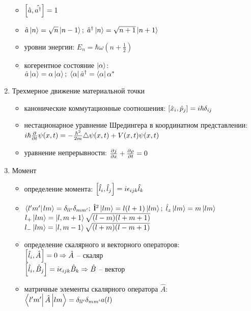 \begin{enumerate}[label=\textbf{\underline{\arabic*.}}]
\begin{itemize}
            \item
            $ \left[ \hat{a}, \hat{a^\dagger} \right] = 1 $
            \item
            $ \hat{a}\left| n \right> = \sqrt{n}\left| n-1 \right>;\; \hat{a}^\dagger\left| n \right> = \sqrt{n+1}\left| n+1 \right> $
            \item уровни энергии:
            $ E_n = \hbar\omega(n+\frac12) $
            \item когерентное состояние $\left| \alpha \right>$: \\
            $ \hat{a}\left| \alpha \right> = \alpha\left| \alpha \right>;\; \left< \alpha \right|\hat{a}^\dagger = \left< \alpha \right|\alpha^* $
        \end{itemize}
\item Трехмерное движение материальной точки  \begin{itemize}
            \item канонические коммутационные соотношения:
            $ \left[ \hat{x}_{i}, \hat{p}_{j} \right] = i\hbar\delta_{ij} $
            \item нестационарное уравнение Шредингера в координатном представлении: \\
            $ i\hbar \frac{\partial }{\partial t}\psi(x,t) = -\frac{\hbar^2}{2m}\triangle\psi(x,t)+V(x,t)\psi(x,t) $
            \item уравнение непрерывности:
            $ \frac{\partial j}{\partial x} + \frac{\partial \rho}{\partial t} = 0 $
        \end{itemize}
\item Момент  \begin{itemize}
            \item определение момента:
            $ \left[ \hat{l}_{i}, \hat{l}_{j} \right] = i\epsilon_{ijk}\hat{l}_k $
            \item
            $ \braket{l'm'}{lm} = \delta_{ll'}\delta_{mm'};\; \hat{\v{l}}^2\ket{lm}=l(l+1)\ket{lm};\; \hat{l}_z\ket{lm}=m\ket{lm} $\\
            $ l_{+}\left| lm \right>=\left| l,m+1 \right>\sqrt{(l-m)(l+m+1)} $\\
            $ l_{-}\left| lm \right>=\left| l,m-1 \right>\sqrt{(l+m)(l-m+1)}$
            \item определение скалярного и векторного операторов: \\
            $ \left[ \hat{l}_{i}, \hat{A}_{} \right] = 0 \Rightarrow \hat{A} $ -- скаляр \\
            $ \left[ \hat{l}_{i}, \hat{B}_{j} \right] = i\epsilon_{ijk}\hat{B}_k \Rightarrow \hat{B} $ -- вектор
            \item матричные элементы скалярного оператора $\hat{A}$:
            $ \matrixel{l'm'}{\hat{A}}{lm} = \delta_{ll'}\delta_{mm'}a(l) $

\end{itemize}
\end{enumerate}
